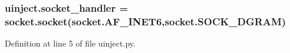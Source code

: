 \subsubsection[{\texorpdfstring{socket\+\_\+handler}{socket_handler}}]{\setlength{\rightskip}{0pt plus 5cm}uinject.\+socket\+\_\+handler = socket.\+socket(socket.\+A\+F\+\_\+\+I\+N\+E\+T6,socket.\+S\+O\+C\+K\+\_\+\+D\+G\+R\+AM)}\hypertarget{namespaceuinject_abb3235eb6e3db601d83d70f41fafef29}{}\label{namespaceuinject_abb3235eb6e3db601d83d70f41fafef29}


Definition at line 5 of file uinject.\+py.

